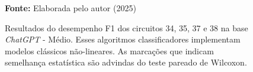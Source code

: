 \begin{figure}
\caption{Resultados do desempenho F1 dos circuitos 34, 35, 37 e 38 na base \textit{ChatGPT} - Médio. Esses algoritmos classificadores implementam modelos clássicos não-lineares. As marcações que indicam semelhança estatística são advindas do teste pareado de Wilcoxon.}
\label{fig:f1:medium:g5}
     \centering
    \centering

      \par\medskip\ABNTEXfontereduzida\selectfont\textbf{Fonte:} Elaborada pelo autor (2025) \par\medskip
\end{figure}